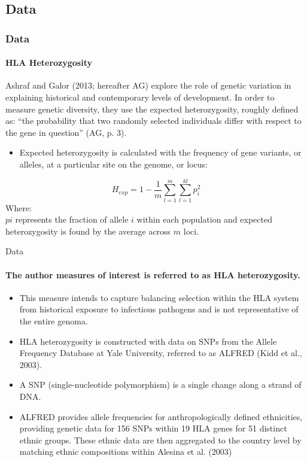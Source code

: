 \documentclass[pdftex,12pt,xcolor=pdftex,table]{beamer}
\theoremstyle{definition}
\theoremstyle{remark}
\numberwithin{equation}{section}
\numberwithin{figure}{section}
\begin{document}
\begin{frame}\section{Data}
\frametitle{Data}
\framesubtitle{HLA Heterozygosity}
\justifying
Ashraf and Galor (2013; hereafter AG) explore the role of genetic variation in explaining historical and contemporary levels of development. In order to measure genetic diversity, they use the expected heterozygosity, roughly defined as: “the probability that two randomly selected individuals differ with respect to the gene in question” (AG, p. 3).
\begin{itemize}
    \item Expected heterozygosity is calculated with the frequency of gene variants, or alleles, at a particular site on the genome, or locus:
 
\end{itemize}
\begin{equation}
    H_{exp}=1-\frac{1}{m}\sum^{m}_{l=1}\sum^{kl}_{l=1}p_{i}^{2}
\end{equation}
Where:\\
$pi$ represents the fraction of allele $i$ within each population and expected heterozygosity is found by the average across $m$ loci.
\end{frame}


\begin{frame}{Data}
\framesubtitle{The author measures of interest is referred to as HLA heterozygosity.}
\justifying

\begin{itemize}
    \item This measure intends to capture balancing selection within the HLA system from historical exposure to infectious pathogens and is not representative of the entire genoma.
\item HLA heterozygosity is constructed with data on SNPs from the Allele Frequency Database at Yale University, referred to as ALFRED (Kidd et al., 2003).
\item A SNP (single-nucleotide polymorphism) is a single change along a strand of DNA. 
\item ALFRED provides allele frequencies for anthropologically defined ethnicities, providing genetic data for 156 SNPs within 19 HLA genes for 51 distinct ethnic groups. These ethnic data are then aggregated to the country level by matching ethnic compositions within Alesina et al. (2003) 

\end{itemize}
\end{frame}
\end{document}
